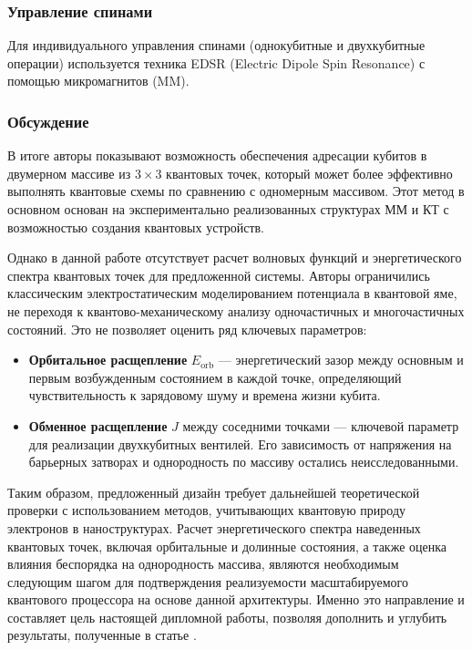 \documentclass[a4paper,14pt]{extreport} %
\begin{document}
\subsubsection{Управление спинами}
Для индивидуального управления спинами (однокубитные и двухкубитные операции) используется техника EDSR (Electric Dipole Spin Resonance) с помощью микромагнитов (MM).

\subsubsection{Обсуждение}
В итоге авторы показывают возможность обеспечения адресации кубитов в двумерном массиве из \(3\times 3\) квантовых точек, который может более эффективно выполнять квантовые схемы по сравнению с одномерным массивом. Этот метод в основном основан на экспериментально реализованных структурах ММ и КТ с возможностью создания квантовых устройств.

Однако в данной работе отсутствует расчет волновых функций и энергетического спектра квантовых точек для предложенной системы. Авторы ограничились классическим электростатическим моделированием потенциала в квантовой яме, не переходя к квантово-механическому анализу одночастичных и многочастичных состояний. Это не позволяет оценить ряд ключевых параметров:
\begin{itemize}
    \item \textbf{Орбитальное расщепление} \(E_{\text{orb}}\) — энергетический зазор между основным и первым возбужденным состоянием в каждой точке, определяющий чувствительность к зарядовому шуму и времена жизни кубита.

    \item \textbf{Обменное расщепление} \(J\) между соседними точками — ключевой параметр для реализации двухкубитных вентилей. Его зависимость от напряжения на барьерных затворах и однородность по массиву остались неисследованными.
\end{itemize}
Таким образом, предложенный дизайн требует дальнейшей теоретической проверки с использованием методов, учитывающих квантовую природу электронов в наноструктурах. Расчет энергетического спектра наведенных квантовых точек, включая орбитальные и долинные состояния, а также оценка влияния беспорядка на однородность массива, являются необходимым следующим шагом для подтверждения реализуемости масштабируемого квантового процессора на основе данной архитектуры. Именно это направление и составляет цель настоящей дипломной работы, позволяя дополнить и углубить результаты, полученные в статье \cite{tadokoro2021}.
\end{document}
